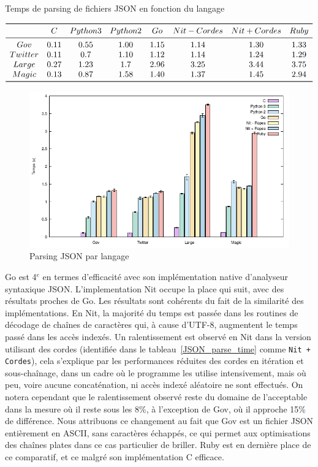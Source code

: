 \begin{table}
	\caption{\label{JSON_parse_time}Temps de parsing de fichiers JSON en fonction du langage}
	\centering
	$\begin{array}{ *{8}{c} }
		\toprule
		 & C & Python 3 & Python 2 & Go & Nit - Cordes & Nit + Cordes & Ruby \\
		\midrule
		Gov & 0.11 & 0.55 & 1.00 & 1.15 & 1.14 & 1.30 & 1.33\\
		Twitter & 0.11 & 0.7 & 1.10 & 1.12 & 1.14 & 1.24 & 1.29\\
		Large & 0.27 & 1.23 & 1.7 & 2.96 & 3.25 & 3.44 & 3.75\\
		Magic & 0.13 & 0.87 & 1.58 & 1.40 & 1.37 & 1.45 & 2.94\\
		\bottomrule
	\end{array}$
\end{table}

\begin{figure}
	\caption{Parsing JSON par langage}
	\label{jsonparse}
	\centering
	\includegraphics[]{figures/parse_json.pdf}
\end{figure}

Go est 4$^{e}$ en termes d'efficacité avec son implémentation native d'analyseur syntaxique JSON.
L'implementation Nit occupe la place qui suit, avec des résultats proches de Go. Les résultats sont
cohérents du fait de la similarité des implémentations.
En Nit, la majorité du temps est passée dans les routines de décodage de chaînes de caractères qui,
à cause d'UTF-8, augmentent le temps passé dans les accès indexés.
Un ralentissement est observé en Nit dans la version utilisant des cordes (identifiée dans le tableau~\ref{JSON_parse_time}
comme \texttt{Nit + Cordes}), cela s'explique par les performances
réduites des cordes en itération et sous-chaînage, dans un cadre où le programme les utilise intensivement, mais où
peu, voire aucune concaténation, ni accès indexé aléatoire ne sont effectués.
On notera cependant que le ralentissement observé reste du domaine de l'acceptable dans la mesure où il reste sous les
8\%, à l'exception de Gov, où il approche 15\% de différence.
Nous attribuons ce changement au fait que Gov est un fichier JSON entièrement en ASCII, sans caractères échappés,
ce qui permet aux optimisations des chaînes plates dans ce cas particulier de briller.
Ruby est en dernière place de ce comparatif, et ce malgré son implémentation C efficace.

